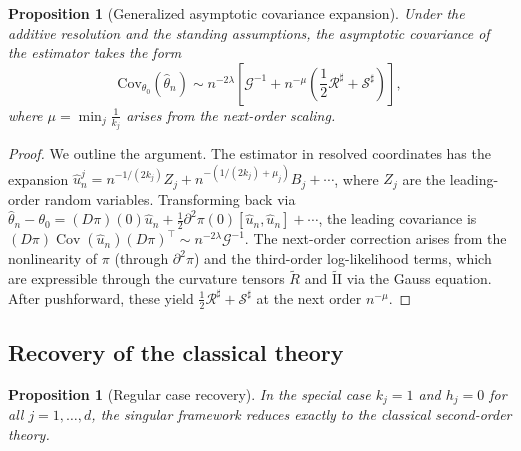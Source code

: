 \documentclass[11pt,letterpaper]{amsart}
\DeclareMathOperator{\Cov}{Cov}
\numberwithin{equation}{section}
\theoremstyle{plain}
\newtheorem{proposition}[theorem]{Proposition}
\theoremstyle{definition}
\theoremstyle{remark}
\begin{document}
\begin{proposition}[Generalized asymptotic covariance expansion]
\label{prop:singular_covariance}
Under the additive resolution and the standing assumptions, the asymptotic covariance of the estimator takes the form
\[
\mathrm{Cov}_{\theta_0}(\hat{\theta}_n)
\sim
n^{-2\lambda}
\left[
\mathcal{G}^{-1}
+
n^{-\mu}
\left(
\frac{1}{2} \mathcal{R}^\sharp + \mathcal{S}^\sharp
\right)
\right],
\]
where $\mu = \min_j \frac{1}{k_j}$ arises from the next-order scaling.
\end{proposition}

\begin{proof}
We outline the argument. The estimator in resolved coordinates has the expansion
$\hat{u}_n^j = n^{-1/(2k_j)} Z_j + n^{-(1/(2k_j) + \mu_j)} B_j + \cdots$,
where $Z_j$ are the leading-order random variables. Transforming back via $\hat\theta_n - \theta_0 = (D\pi)(0)\hat{u}_n + \frac{1}{2}\partial^2\pi(0)[\hat{u}_n, \hat{u}_n] + \cdots$, the leading covariance is $(D\pi)\Cov(\hat{u}_n)(D\pi)^\top \sim n^{-2\lambda}\mathcal{G}^{-1}$. The next-order correction arises from the nonlinearity of $\pi$ (through $\partial^2\pi$) and the third-order log-likelihood terms, which are expressible through the curvature tensors $\widetilde{R}$ and $\widetilde{\mathrm{II}}$ via the Gauss equation. After pushforward, these yield $\frac{1}{2}\mathcal{R}^\sharp + \mathcal{S}^\sharp$ at the next order $n^{-\mu}$.
\end{proof}

\subsection{Recovery of the classical theory}

\begin{proposition}[Regular case recovery]
\label{prop:regular_recovery}
In the special case $k_j = 1$ and $h_j = 0$ for all $j = 1, \ldots, d$, the singular framework reduces exactly to the classical second-order theory.
\end{proposition}
\end{document}
